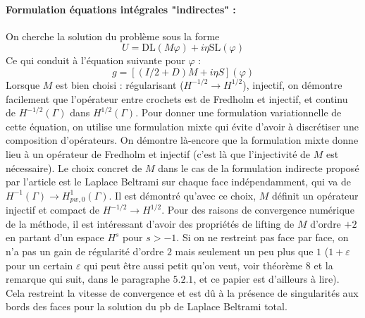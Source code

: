 \documentclass[11pt,a4paper]{article}
\begin{document}
\paragraph{Formulation équations intégrales "indirectes" :} On cherche la solution du problème sous la forme 
\[ U = \text{DL}(M\varphi) + i\eta \text{SL}(\varphi)\]
Ce qui conduit à l'équation suivante pour $\varphi$ : 
\[ g = \left[\left(I/2 + D\right)M + i\eta S\right](\varphi)\]
Lorsque $M$ est bien choisi : régularisant ($H^{-1/2}\to H^{1/2}$), injectif, on démontre facilement que l'opérateur entre crochets est de Fredholm et injectif, et continu de $H^{-1/2}(\Gamma)$ dans $H^{1/2}(\Gamma)$.  
Pour donner une formulation variationnelle de cette équation, on utilise une formulation mixte qui évite d'avoir à discrétiser une composition d'opérateurs. On démontre là-encore que la formulation mixte donne lieu à un opérateur de Fredholm et injectif (c'est là que l'injectivité de $M$ est nécessaire).  
Le choix concret de $M$ dans le cas de la formulation indirecte proposé par l'article est le Laplace Beltrami sur chaque face indépendamment, qui va de $H^{-1}(\Gamma)\to H^1_{pw,0}(\Gamma)$. Il est démontré qu'avec ce choix, $M$ définit un opérateur injectif et compact de $H^{-1/2}\to H^{1/2}$. Pour des raisons de convergence numérique de la méthode, il est intéressant d'avoir des propriétés de lifting de $M$ d'ordre $+2$ en partant d'un espace $H^s$ pour $s > -1$. Si on ne restreint pas face par face, on n'a pas un gain de régularité d'ordre $2$ mais seulement un peu plus que $1$ ($1+\varepsilon$ pour un certain $\varepsilon$ qui peut être aussi petit qu'on veut, voir \cite{buffa2002boundary} théorème $8$ et la remarque qui suit, dans le paragraphe $5.2.1$, et ce papier est d'ailleurs à lire). Cela restreint la vitesse de convergence et est dû à la présence de singularités aux bords des faces pour la solution du pb de Laplace Beltrami total.
\end{document}
